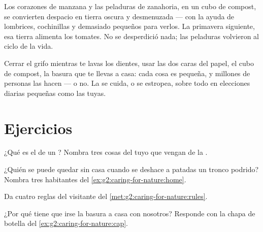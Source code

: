 \begin{example}\label{ex:g2:caring-for-nature:compost}
Los corazones de manzana y las peladuras de zanahoria, en un cubo de
compost, se convierten despacio en tierra oscura y desmenuzada --- con
la ayuda de lombrices, cochinillas y  demasiado pequeños
para verlos. La primavera siguiente, esa tierra alimenta los tomates.
No se desperdició nada; las peladuras volvieron al ciclo de la vida.
\end{example}

\begin{remark}\label{rem:g2:caring-for-nature:count}
Cerrar el grifo mientras te lavas los dientes, usar las dos caras del
papel, el cubo de compost, la basura que te llevas a casa: cada cosa
es pequeña, y millones de personas las hacen --- o no. La 
se cuida, o se estropea, sobre todo en elecciones diarias pequeñas
como las tuyas.
\end{remark}

\section{Ejercicios}

\begin{exercise}[$\star$]\label{exo:g2:caring-for-nature:1}
¿Qué es el  de un ? Nombra tres cosas del tuyo que
vengan de la .
\end{exercise}

\begin{exercise}[$\star$]\label{exo:g2:caring-for-nature:2}
¿Quién se puede quedar sin casa cuando se deshace a patadas un tronco
podrido? Nombra tres habitantes del \cref{ex:g2:caring-for-nature:home}.
\end{exercise}

\begin{exercise}[$\star$]\label{exo:g2:caring-for-nature:3}
Da cuatro reglas del visitante del \cref{met:g2:caring-for-nature:rules}.
\end{exercise}

\begin{exercise}[$\star$]\label{exo:g2:caring-for-nature:4}
¿Por qué tiene que irse la basura a casa con nosotros? Responde con la
chapa de botella del \cref{ex:g2:caring-for-nature:cap}.
\end{exercise}

